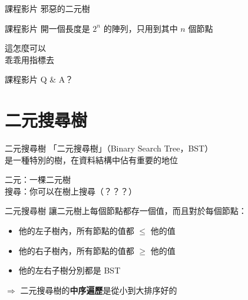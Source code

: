 \documentclass[aspectratio=169]{beamer}
\begin{document}
\begin{frame}{課程影片}
    邪惡的二元樹

    \begin{center}
    \end{center}
\end{frame}

\begin{frame}{課程影片}
    開一個長度是 $2 ^ n$ 的陣列，只用到其中 $n$ 個節點

    這怎麼可以\\
    乖乖用指標去
\end{frame}

\begin{frame}{課程影片}
    Q \& A？
\end{frame}


\section{二元搜尋樹}

\begin{frame}{二元搜尋樹}
    「二元搜尋樹」（Binary Search Tree，BST）\\
    是一種特別的樹，在資料結構中佔有重要的地位

    二元：一棵二元樹\\
    搜尋：你可以在樹上搜尋（？？？）
\end{frame}

\begin{frame}{二元搜尋樹}
    讓二元樹上每個節點都存一個值，而且對於每個節點：

    \begin{itemize}
        \item 他的左子樹內，所有節點的值都 $\leq$ 他的值
        \item 他的右子樹內，所有節點的值都 $\geq$ 他的值
        \item 他的左右子樹分別都是 BST
    \end{itemize}

    $\Rightarrow$ 二元搜尋樹的\textbf{中序遍歷}是從小到大排序好的
\end{frame}
\end{document}

